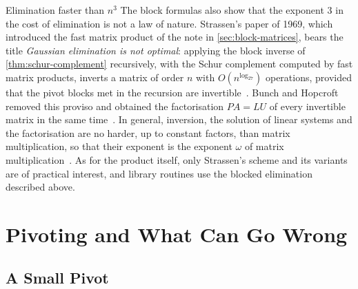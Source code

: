 \begin{note}{Elimination faster than \texorpdfstring{$n^3$}{n\^{}3}}
The block formulas also show that the exponent $3$ in the cost of elimination is not a law of nature. Strassen's paper of 1969, which introduced the fast matrix product of the note in \cref{sec:block-matrices}, bears the title \emph{Gaussian elimination is not optimal}: applying the block inverse of \cref{thm:schur-complement} recursively, with the Schur complement computed by fast matrix products, inverts a matrix of order $n$ with $O(n^{\log_27})$ operations, provided that the pivot blocks met in the recursion are invertible~\cite{strassen1969}. Bunch and Hopcroft removed this proviso and obtained the factorisation $PA=LU$ of every invertible matrix in the same time~\cite{bunch1974}. In general, inversion, the solution of linear systems and the factorisation are no harder, up to constant factors, than matrix multiplication, so that their exponent is the exponent $\omega$ of matrix multiplication~\cite[Sect.~28.2]{cormen2022}. As for the product itself, only Strassen's scheme and its variants are of practical interest, and library routines use the blocked elimination described above.
\end{note}
\section{Pivoting and What Can Go Wrong}
\label{sec:pivoting}

\subsection{A Small Pivot}

